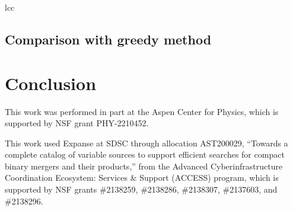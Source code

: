 \documentclass[twocolumn,times]{aastex631}
\begin{document}
\begin{deluxetable}{lcc}
    \startdata
    
    \enddata
\end{deluxetable}

\subsection{Comparison with greedy method}

\section{Conclusion}

\begin{acknowledgments}
This work was performed in part at the Aspen Center for Physics, which is supported by \ac{NSF} grant PHY-2210452.

This work used Expanse at \ac{SDSC} through allocation AST200029, ``Towards a complete catalog of variable sources to support efficient searches for compact binary mergers and their products,'' from the Advanced Cyberinfrastructure Coordination Ecosystem: Services \& Support (ACCESS) program, which is supported by \ac{NSF} grants \#2138259, \#2138286, \#2138307, \#2137603, and \#2138296.
\end{acknowledgments}

\vspace{5mm}

{}

\end{document}

